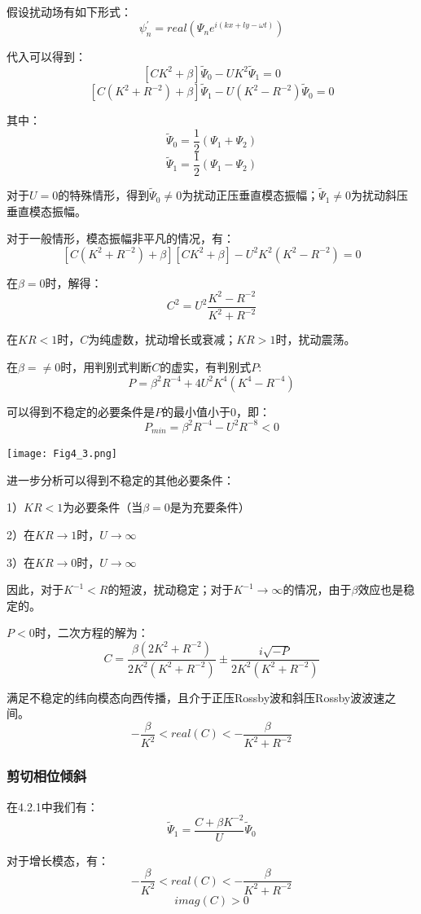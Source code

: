 \documentclass{article}
\begin{document}
假设扰动场有如下形式：
$$\psi^{\prime}_n = real(\Psi_ne^{i(kx+ly-\omega t)})$$

代入可以得到：
$$[CK^2 +\beta]\tilde{\Psi}_0-UK^2\tilde{\Psi}_1 = 0$$
$$[C(K^2+R^{-2}) +\beta]\tilde{\Psi}_1-U(K^2-R^{-2})\tilde{\Psi}_0 = 0$$

其中：
$$\tilde{\Psi}_0 = \frac{1}{2}(\Psi_1 +\Psi_2)$$
$$\tilde{\Psi}_1 = \frac{1}{2}(\Psi_1 -\Psi_2)$$

对于$U=0$的特殊情形，得到$\tilde{\Psi}_0\ne0$为扰动正压垂直模态振幅；$\tilde{\Psi}_1\ne0$为扰动斜压垂直模态振幅。

对于一般情形，模态振幅非平凡的情况，有：
$$[C(K^2+R^{-2}) +\beta][CK^2 +\beta]-U^2K^2(K^2-R^{-2}) = 0$$

在$\beta=0$时，解得：
$$C^2 = U^2\frac{K^2-R^{-2}}{K^2+R^{-2}}$$

在$KR<1$时，$C$为纯虚数，扰动增长或衰减；$KR>1$时，扰动震荡。

在$\beta=\ne0$时，用判别式判断$C$的虚实，有判别式$P$:
$$P=\beta^2R^{-4}+4U^2K^4(K^4-R^{-4})$$

可以得到不稳定的必要条件是$P$的最小值小于$0$，即：
$$P_{min}=\beta^2R^{-4}-U^2R^{-8}<0$$

\begin{center}
    \texttt{[image: Fig4\_3.png]}
\end{center}

进一步分析可以得到不稳定的其他必要条件：

1）$KR<1$为必要条件（当$\beta=0$是为充要条件）

2）在$KR \rightarrow 1$时，$U \rightarrow \infty$

3）在$KR \rightarrow 0$时，$U \rightarrow \infty$

因此，对于$K^{-1}<R$的短波，扰动稳定；对于$K^{-1}\rightarrow\infty$的情况，由于$\beta$效应也是稳定的。

$P<0$时，二次方程的解为：
$$C = \frac{\beta(2K^2+R^{-2})}{2K^2(K^2+R^{-2})}\pm\frac{i\sqrt{-P}}{2K^2(K^2+R^{-2})}$$

满足不稳定的纬向模态向西传播，且介于正压Rossby波和斜压Rossby波波速之间。
$$-\frac{\beta}{K^2}<real(C)<-\frac{\beta}{K^2+R^{-2}}$$


\subsubsection{剪切相位倾斜}
在4.2.1中我们有：
$$\tilde{\Psi}_1=\frac{C +\beta K^{-2}}{U}\tilde{\Psi}_0 $$

对于增长模态，有：
$$-\frac{\beta}{K^2}<real(C)<-\frac{\beta}{K^2+R^{-2}}$$
$$imag(C)>0$$
\end{document}
